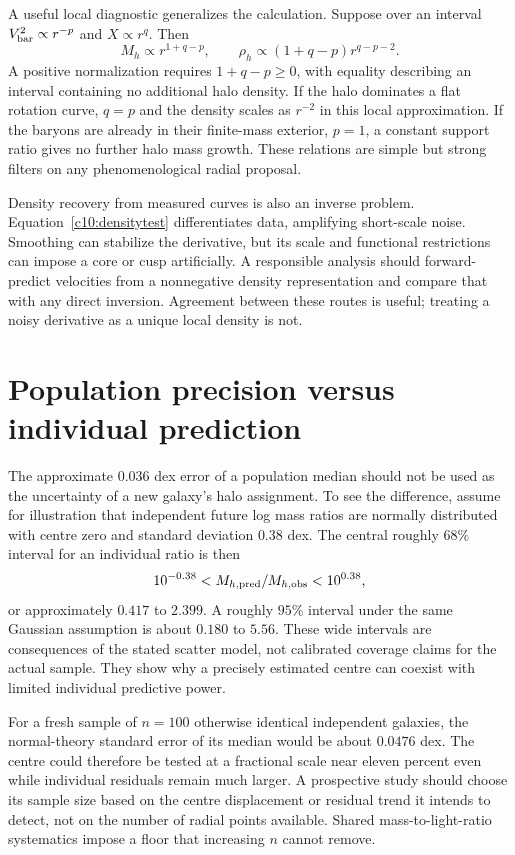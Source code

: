 A useful local diagnostic generalizes the calculation. Suppose over an interval $V_{\rm bar}^2\propto r^{-p}$ and $X\propto r^q$. Then
\begin{equation}
 M_h\propto r^{1+q-p},\qquad
 \rho_h\propto(1+q-p)r^{q-p-2}.
 \label{c10:powerlawpositivity}
\end{equation}
A positive normalization requires $1+q-p\geq0$, with equality describing an interval containing no additional halo density. If the halo dominates a flat rotation curve, $q=p$ and the density scales as $r^{-2}$ in this local approximation. If the baryons are already in their finite-mass exterior, $p=1$, a constant support ratio gives no further halo mass growth. These relations are simple but strong filters on any phenomenological radial proposal.

Density recovery from measured curves is also an inverse problem. Equation~\eqref{c10:densitytest} differentiates data, amplifying short-scale noise. Smoothing can stabilize the derivative, but its scale and functional restrictions can impose a core or cusp artificially. A responsible analysis should forward-predict velocities from a nonnegative density representation and compare that with any direct inversion. Agreement between these routes is useful; treating a noisy derivative as a unique local density is not.

\section{Population precision versus individual prediction}

The approximate $0.036$ dex error of a population median should not be used as the uncertainty of a new galaxy's halo assignment. To see the difference, assume for illustration that independent future log mass ratios are normally distributed with centre zero and standard deviation $0.38$ dex. The central roughly $68\%$ interval for an individual ratio is then
\begin{equation}
 10^{-0.38}<M_{h,{\rm pred}}/M_{h,{\rm obs}}<10^{0.38},
 \label{c10:individual68}
\end{equation}
or approximately $0.417$ to $2.399$. A roughly $95\%$ interval under the same Gaussian assumption is about $0.180$ to $5.56$. These wide intervals are consequences of the stated scatter model, not calibrated coverage claims for the actual sample. They show why a precisely estimated centre can coexist with limited individual predictive power.

For a fresh sample of $n=100$ otherwise identical independent galaxies, the normal-theory standard error of its median would be about $0.0476$ dex. The centre could therefore be tested at a fractional scale near eleven percent even while individual residuals remain much larger. A prospective study should choose its sample size based on the centre displacement or residual trend it intends to detect, not on the number of radial points available. Shared mass-to-light-ratio systematics impose a floor that increasing $n$ cannot remove.

